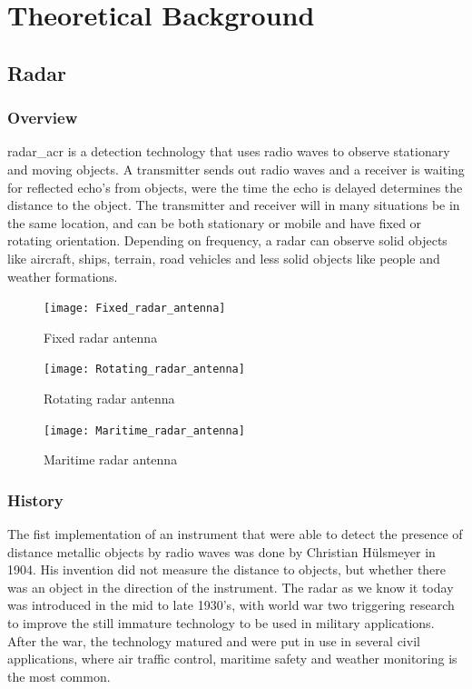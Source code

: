 
\chapter{Theoretical Background}\label{chapter:theoretical_background}
\section{Radar}
\subsection{Overview}
\gls{radar_acr} is a detection technology that uses radio waves to observe stationary and moving objects. A transmitter sends out radio waves and a receiver is waiting for reflected echo's from objects, were the time the echo is delayed determines the distance to the object. The transmitter and receiver will in many situations be in the same location, and can be both stationary or mobile and have fixed or rotating orientation. Depending on frequency, a radar can observe solid objects like aircraft, ships, terrain, road vehicles and less solid objects like people and weather formations.
\begin{figure}
\centering
\begin{minipage}{0.3\textwidth}
\texttt{[image: Fixed\_radar\_antenna]}
\caption{Fixed radar antenna}\label{fig:fixed_radar_antenna}
\end{minipage}\hfill
\begin{minipage}{0.3\textwidth}
\texttt{[image: Rotating\_radar\_antenna]}
\caption{Rotating radar antenna}\label{fig:rotating_radar_antenna}
\end{minipage}\hfill
\begin{minipage}{0.3\textwidth}
\texttt{[image: Maritime\_radar\_antenna]}
\caption{Maritime radar antenna}\label{fig:maritime_radar_antenna}
\end{minipage}
\end{figure}

\subsection{History}
The fist implementation of an instrument that were able to detect the presence of distance metallic objects by radio waves was done by Christian Hülsmeyer in 1904. His invention did not measure the distance to objects, but whether there was an object in the direction of the instrument. The radar as we know it today was introduced in the mid to late 1930's, with world war two triggering research to improve the still immature technology to be used in military applications. After the war, the technology matured and were put in use in several civil applications, where air traffic control, maritime safety and weather monitoring is the most common.

